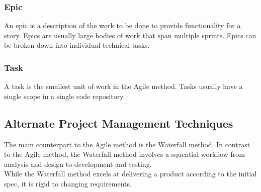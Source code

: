 \subsubsection{Epic}
An epic is a description of the work to be done to provide functionality for a story. Epics are usually large bodies of work that span multiple sprints. Epics can be broken down into individual technical tasks.

\subsubsection{Task}
A task is the smallest unit of work in the Agile method. Tasks usually have a single scope in a single code repository.

\subsection{Alternate Project Management Techniques}

The main counterpart to the Agile method is the Waterfall method. In contrast to the Agile method, the Waterfall method involves a squential workflow from analysis and design to development and testing. \\

While the Waterfall method excels at delivering a product according to the initial spec, it is rigid to changing requirements. 